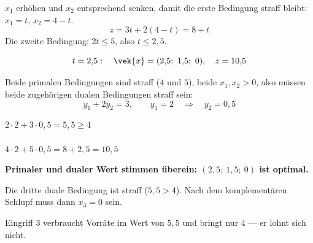 \begin{aufgabe}
 $x_1$ erhöhen und $x_2$ entsprechend senken, damit die erste Bedingung straff bleibt: $x_1 = t$, $x_2 = 4-t$.
\[ z = 3t + 2(4-t) = 8+t \]
Die zweite Bedingung: $2t \le 5$, also $t \le 2{,}5$.

\[ t = 2{,}5: \quad \vek{x} = (2{,}5;\ 1{,}5;\ 0), \quad z = 10{,}5 \]

Beide primalen Bedingungen sind straff ($4$ und $5$), beide $x_1,x_2>0$, also müssen beide zugehörigen dualen Bedingungen straff sein:
\[ y_1+2y_2 = 3, \qquad y_1 = 2 \quad\Longrightarrow\quad y_2 = 0{,}5 \]

 $2\cdot2 + 3\cdot0{,}5 = 5{,}5 \ge 4$ \checkmark\\
 \checkmark\\
 $4\cdot2 + 5\cdot0{,}5 = 8+2{,}5 = 10{,}5$ \checkmark

\begin{center}
\begin{minipage}{0.9\textwidth}
\textbf{Primaler und dualer Wert stimmen überein: $(2{,}5;\ 1{,}5;\ 0)$ ist optimal.}
\end{minipage}
\end{center}

\begin{center}
\begin{minipage}{0.88\textwidth}
\end{minipage}
\end{center}

Die dritte duale Bedingung ist  straff ($5{,}5 > 4$). Nach dem komplementären Schlupf muss dann $x_3 = 0$ sein.

 Eingriff $3$ verbraucht Vorräte im Wert von $5{,}5$ und bringt nur $4$ --- er lohnt sich nicht.
\end{aufgabe}

